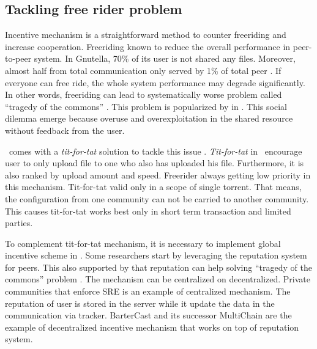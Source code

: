 \subsection{Tackling free rider problem}
Incentive mechanism is a straightforward method to counter freeriding and increase cooperation. Freeriding known to reduce the overall performance in peer-to-peer system. In Gnutella, 70\% of its user is not shared any files. Moreover, almost half from total communication only served by 1\% of total peer \cite{2000:freeridegnutella:adar}. If everyone can free ride, the whole system performance may degrade significantly. In other words, freeriding can lead to systematically worse problem called ``tragedy of the commons'' \cite{1968:tragedycommon:hardin}. This problem is popularized by \citet*{1968:tragedycommon:hardin} in \citeyear{1968:tragedycommon:hardin}. This social dilemma emerge because overuse and overexploitation in the shared resource without feedback from the user.


\bt~comes with a \textit{tit-for-tat} solution to tackle this issue \cite{2003:bittorrent:cohen}. \textit{Tit-for-tat} in \bt~encourage user to only upload file to one who also has uploaded his file. Furthermore, it is also ranked by upload amount and speed. Freerider always getting low priority in this mechanism. Tit-for-tat valid only in a scope of single torrent. That means, the configuration from one community can not be carried to another community. This causes tit-for-tat works best only in short term transaction and limited parties.

To complement tit-for-tat mechanism, it is necessary to implement global incentive scheme in \bt. Some researchers start by leveraging the reputation system for peers. This also supported by \citeauthor{2002:reputationtotragedy:milinski} that reputation can help solving ``tragedy of the commons'' problem \cite{2002:reputationtotragedy:milinski}. The mechanism can be centralized on decentralized. Private communities that enforce SRE is an example of centralized mechanism. The reputation of user is stored in the server while it update the data in the communication via tracker. BarterCast \cite{2009:bartercast:meulpolder} and its successor MultiChain \cite{2015:multichain:norberhuis} are the example of decentralized incentive mechanism that works on top of reputation system. 


